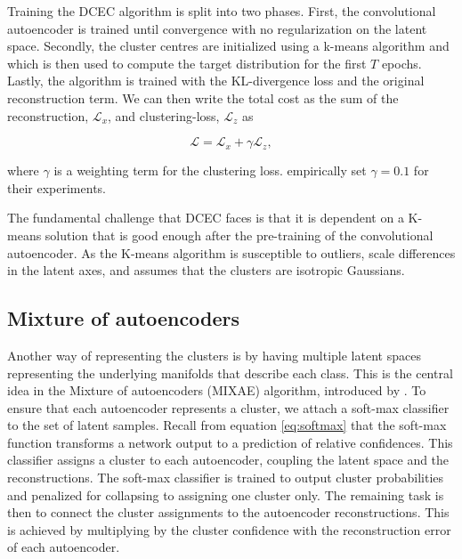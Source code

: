 Training the DCEC algorithm is split into two phases. First, the convolutional autoencoder is trained until convergence with no regularization on the latent space. Secondly, the cluster centres are initialized using a k-means algorithm and which is then used to compute the target distribution for the first $T$ epochs. Lastly, the algorithm is trained with the KL-divergence loss and the original reconstruction term. We can then write the total cost as the sum of the reconstruction, $\mathcal{L}_x$, and clustering-loss, $\mathcal{L}_z$ as 

\begin{equation}
\mathcal{L} = \mathcal{L}_x + \gamma \mathcal{L}_z,
\end{equation}

\noindent where $\gamma$ is a weighting term for the clustering loss. \cite{Guo2017} empirically set $\gamma=0.1$ for their experiments. 

The fundamental challenge that DCEC faces is that it is dependent on a K-means solution that is good enough after the pre-training of the convolutional autoencoder. As the K-means algorithm is susceptible to outliers, scale differences in the latent axes,  and assumes that the clusters are isotropic Gaussians. 

\subsection{Mixture of autoencoders}\label{sec:mixae}

Another way of representing the clusters is by having multiple latent spaces representing the underlying manifolds that describe each class. This is the central idea in the Mixture of autoencoders (MIXAE) algorithm, introduced by  \cite{Zhang}. To ensure that each autoencoder represents a cluster, we attach a soft-max classifier to the set of latent samples. Recall from equation \ref{eq:softmax} that the soft-max function transforms a network output to a prediction of relative confidences. This classifier assigns a cluster to each autoencoder, coupling the latent space and the reconstructions. The soft-max classifier is trained to output cluster probabilities and penalized for collapsing to assigning one cluster only. The remaining task is then to connect the cluster assignments to the autoencoder reconstructions. This is achieved by multiplying by the cluster confidence with the reconstruction error of each autoencoder.

